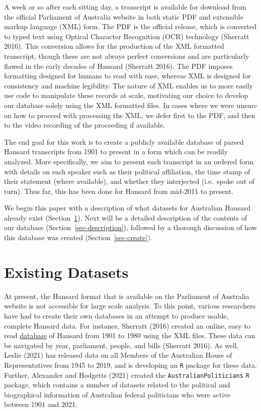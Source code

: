 \documentclass[
  letterpaper,
  DIV=11,
  numbers=noendperiod]{scrartcl}
\begin{document}
A week or so after each sitting day, a transcript is available for
download from the official Parliament of Australia website in both
static PDF and extensible markup language (XML) form. The PDF is the
official release, which is converted to typed text using Optical
Character Recognition (OCR) technology (Sherratt 2016). This conversion
allows for the production of the XML formatted transcript, though these
are not always perfect conversions and are particularly flawed in the
early decades of Hansard (Sherratt 2016). The PDF imposes formatting
designed for humans to read with ease, whereas XML is designed for
consistency and machine legibility. The nature of XML enables us to more
easily use code to manipulate these records at scale, motivating our
choice to develop our database solely using the XML formatted files. In
cases where we were unsure on how to proceed with processing the XML, we
defer first to the PDF, and then to the video recording of the
proceeding if available.

The end goal for this work is to create a publicly available database of
parsed Hansard transcripts from 1901 to present in a form which can be
readily analyzed. More specifically, we aim to present each transcript
in an ordered form with details on each speaker such as their political
affiliation, the time stamp of their statement (where available), and
whether they interjected (i.e.~spoke out of turn). Thus far, this has
been done for Hansard from mid-2011 to present.

We begin this paper with a description of what datasets for Australian
Hansard already exist (Section~\ref{sec-existing}). Next will be a
detailed description of the contents of our database
(Section~\ref{sec-description}), followed by a thorough discussion of
how this database was created (Section~\ref{sec-create}).

\hypertarget{sec-existing}{%
\section{Existing Datasets}\label{sec-existing}}

At present, the Hansard format that is available on the Parliament of
Australia website is not accessible for large scale analysis. To this
point, various researchers have had to create their own databases in an
attempt to produce usable, complete Hansard data. For instance, Sherratt
(2016) created an online, easy to read
\href{http://historichansard.net}{database} of Hansard from 1901 to 1980
using the XML files. These data can be navigated by year, parliament,
people, and bills (Sherratt 2016). As well, Leslie (2021) has released
data on all Members of the Australian House of Representatives from 1945
to 2019, and is developing an \texttt{R} package for these data.
Further, Alexander and Hodgetts (2021) created the
\texttt{AustralianPoliticians} \texttt{R} package, which contains a
number of datasets related to the political and biographical information
of Australian federal politicians who were active between 1901 and 2021.
\end{document}
